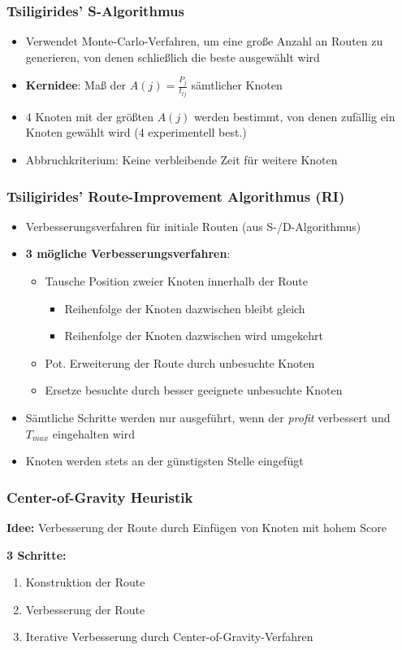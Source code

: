 \documentclass{beamer}
\begin{document}
\begin{frame}
  \frametitle{Tsiligirides' S-Algorithmus}
  \begin{itemize}
    \item Verwendet Monte-Carlo-Verfahren, um eine große Anzahl an Routen zu generieren,
    von denen schließlich die beste ausgewählt wird
    \item \textbf{Kernidee}: Maß der  $A(j) = \frac{P_j}{t_{lj}}$ sämtlicher Knoten
    \item $4$ Knoten mit der größten $A(j)$ werden bestimmt, von denen zufällig ein Knoten gewählt wird ($4$ experimentell best.)
    \item Abbruchkriterium: Keine verbleibende Zeit für weitere Knoten
  \end{itemize}
\end{frame}

\begin{frame}
  \frametitle{Tsiligirides' Route-Improvement Algorithmus (RI)}
  \begin{itemize}
    \item Verbesserungsverfahren für initiale Routen (aus S-/D-Algorithmus)
    \item \textbf{3 mögliche Verbesserungsverfahren}:
    \begin{itemize}
      \item Tausche Position zweier Knoten innerhalb der Route
      \begin{itemize}
        \item Reihenfolge der Knoten dazwischen bleibt gleich
        \item Reihenfolge der Knoten dazwischen wird umgekehrt
      \end{itemize}
      \item Pot. Erweiterung der Route durch unbesuchte Knoten
      \item Ersetze besuchte durch besser geeignete unbesuchte Knoten
    \end{itemize}
    \item Sämtliche Schritte werden nur ausgeführt, wenn der \textit{profit} verbessert und $T_{max}$ eingehalten wird
    \item Knoten werden stets an der günstigsten Stelle eingefügt
  \end{itemize}
\end{frame}

\begin{frame}
  \frametitle{Center-of-Gravity Heuristik}
  \textbf{Idee:}
  Verbesserung der Route durch Einfügen von Knoten mit hohem Score \

  \textbf{3 Schritte:}
  \begin{enumerate}
    \item Konstruktion der Route
    \item Verbesserung der Route
    \item Iterative Verbesserung durch Center-of-Gravity-Verfahren
  \end{enumerate}
\end{frame}
\end{document}
